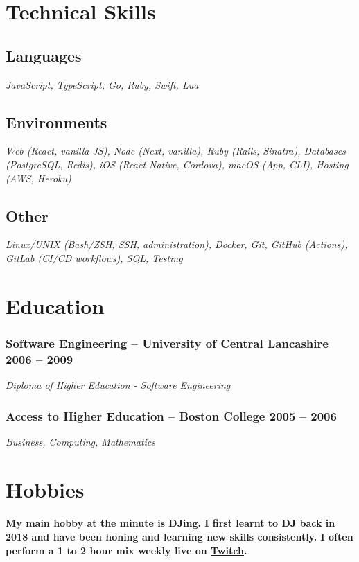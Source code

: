 \documentclass[a4paper]{article}
\newcommand{\datedsubsection}[2]{
  \subsubsection{#1 \hfill \textbf{#2}}
}
\begin{document}
\section{Technical Skills}
\subsection{Languages}
\textit{JavaScript, TypeScript, Go, Ruby, Swift, Lua}
\subsection{Environments}
\textit{Web (React, vanilla JS), Node (Next, vanilla), Ruby (Rails, Sinatra), Databases (PostgreSQL, Redis), iOS (React-Native, Cordova), macOS (App, CLI), Hosting (AWS, Heroku)}
\subsection{Other}
\textit{Linux/UNIX (Bash/ZSH, SSH, administration), Docker, Git, GitHub (Actions), GitLab (CI/CD workflows), SQL, Testing}

\section{Education}
\datedsubsection{\textbf{Software Engineering} -- University of Central Lancashire}{2006 -- 2009}
\textit{Diploma of Higher Education - Software Engineering}
\datedsubsection{\textbf{Access to Higher Education} -- Boston College}{2005 -- 2006}
\textit{Business, Computing, Mathematics}

\section{Hobbies}
\paragraph{My main hobby at the minute is DJing. I first learnt to DJ back in 2018 and have been honing and learning new skills consistently. I often perform a 1 to 2 hour mix weekly live on \href{https://twitch.tv/iamdjriff}{Twitch}.}
\end{document}
